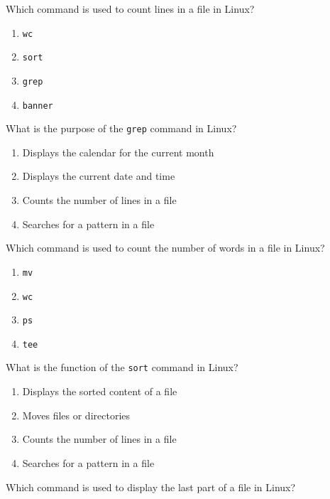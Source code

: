 \documentclass[11pt,a4paper]{article}
\begin{document}
\begin{parts}
  \item Which command is used to count lines in a file in Linux?
  
\begin{enumerate}[label=(\alph*),itemsep=2pt]
    \item   \texttt{wc}
    \item   \texttt{sort}
    \item   \texttt{grep}
    \item   \texttt{banner}
  \end{enumerate}
  
  \item What is the purpose of the   \texttt{grep} command in Linux?
  
\begin{enumerate}[label=(\alph*),itemsep=2pt]
    \item Displays the calendar for the current month
    \item Displays the current date and time
    \item Counts the number of lines in a file
    \item Searches for a pattern in a file
  \end{enumerate}
  
  \item Which command is used to count the number of words in a file in Linux?
  
\begin{enumerate}[label=(\alph*),itemsep=2pt]
    \item   \texttt{mv}
    \item   \texttt{wc}
    \item   \texttt{ps}
    \item   \texttt{tee}
  \end{enumerate}
  
  \item What is the function of the   \texttt{sort} command in Linux?
  
\begin{enumerate}[label=(\alph*),itemsep=2pt]
    \item Displays the sorted content of a file
    \item Moves files or directories
    \item Counts the number of lines in a file
    \item Searches for a pattern in a file
  \end{enumerate}
  
  \item Which command is used to display the last part of a file in Linux?
  

\end{parts}
\end{document}
